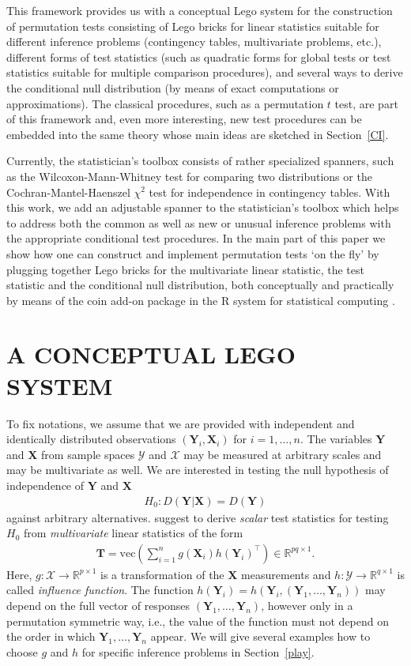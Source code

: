 \documentclass{article}
\newcommand{\Rpackage}[1]{{\normalfont\fontseries{b}\selectfont #1}}
\newcommand{\RR}{\textsf{R}}
\newcommand{\R}{\mathbb{R} }
\newcommand{\X}{\mathbf{X}}
\newcommand{\Y}{\mathbf{Y}}
\newcommand{\T}{\mathbf{T}}
\renewcommand{\vec}{\text{vec}}
\begin{document}
This framework provides us with a conceptual Lego system for the construction
of permutation tests consisting of Lego bricks for linear statistics
suitable for different inference problems (contingency tables, multivariate
problems, etc.), different forms of test statistics (such as quadratic forms
for global tests or test statistics suitable for multiple comparison
procedures), and several ways to derive the conditional null
distribution (by means of exact computations or approximations). 
The classical procedures, such as a permutation $t$ test, are part
of this framework and, even more interesting, new test procedures can be
embedded into the same theory whose main ideas are sketched in
Section~\ref{CI}.

Currently, the statistician's toolbox consists of rather specialized spanners,
such as the Wilcoxon-Mann-Whitney test for comparing two distributions 
or the Cochran-Mantel-Haenszel $\chi^2$ test for independence in
contingency tables. With this work, we add an adjustable spanner to the 
statistician's toolbox which helps to address both the common as well 
as new or unusual inference problems with the appropriate 
conditional test procedures. In the main part of this paper we show how one can
construct and implement permutation tests `on the fly' by plugging together Lego bricks for
the multivariate linear statistic, the test statistic and the conditional
null distribution, both conceptually and practically by means of the 
\Rpackage{coin} add-on package 
 \citep{PKG:coin} in the \RR{} system for statistical computing
\citep{Rcore2005}.


\section{A CONCEPTUAL LEGO SYSTEM \label{CI}}

To fix notations,
we assume that we are provided with independent and identically distributed 
observations
$(\Y_i, \X_i)$ for $i = 1, \dots, n$.
The variables $\Y$ and $\X$ from sample spaces $\mathcal{Y}$ and
$\mathcal{X}$ may
be measured at arbitrary scales and may be multivariate as well. 
We are interested in testing the null hypothesis of independence of $\Y$ and $\X$
\begin{eqnarray*}
H_0: D(\Y | \X) = D(\Y)
\end{eqnarray*}
against arbitrary alternatives. \cite{StrasserWeber1999} suggest to derive
\textit{scalar} test statistics for testing $H_0$ from \textit{multivariate}
linear statistics of the form 
\begin{eqnarray*}
\T = \vec\left(\sum_{i = 1}^n g(\X_i) h(\Y_i)^\top\right)
\in \R^{pq \times 1}.
\end{eqnarray*}
Here, $g: \mathcal{X} \rightarrow \R^{p \times 1}$ is a transformation of
the $\X$ measurements and $h: \mathcal{Y} \rightarrow
\R^{q \times 1}$ is called \emph{influence function}. The function $h(\Y_i)
= h(\Y_i, (\Y_1, \dots, \Y_n))$ may depend on the full vector of responses 
$(\Y_1, \dots, \Y_n)$, however only 
in a permutation symmetric way, i.e., the value of the
function must not depend on the order in which $\Y_1, \dots, \Y_n$ appear.
We will give several examples how to choose $g$ and $h$
for specific inference problems in Section~\ref{play}.
\end{document}
